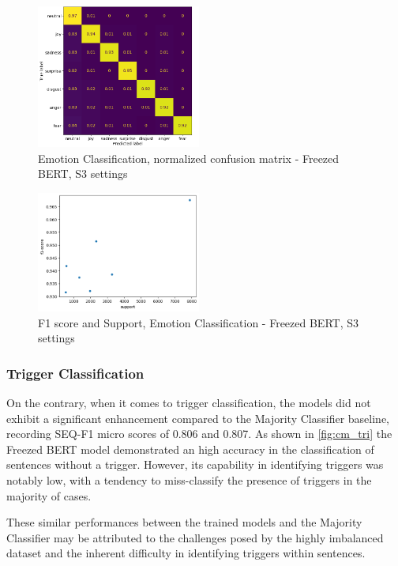 \documentclass[11pt,table,xcdraw]{article}
\begin{document}
\begin{figure}[]
    \centering
    \includegraphics[width=0.48\textwidth]{img/cm_emo_S3.png}
    \caption{Emotion Classification, normalized confusion matrix - Freezed BERT, S3 settings}
    \label{fig:cm_emo}
    \centering
\end{figure}

\begin{figure}
    \centering
    \includegraphics[width=0.48\textwidth]{img/scatter.png}
    \caption{F1 score and Support, Emotion Classification - Freezed BERT, S3 settings}
    \label{fig:scatter}
\end{figure}

\subsubsection{Trigger Classification}
On the contrary, when it comes to trigger classification, the models did not exhibit a significant enhancement compared to the Majority Classifier baseline, recording SEQ-F1 micro scores of 0.806 and 0.807. As shown in \autoref{fig:cm_tri} the Freezed BERT model demonstrated an high accuracy in the classification of sentences without a trigger. However, its capability in identifying triggers was notably low, with a tendency to miss-classify the presence of triggers in the majority of cases.

These similar performances between the trained models and the Majority Classifier may be attributed to the challenges posed by the highly imbalanced dataset and the inherent difficulty in identifying triggers within sentences. 
\end{document}
